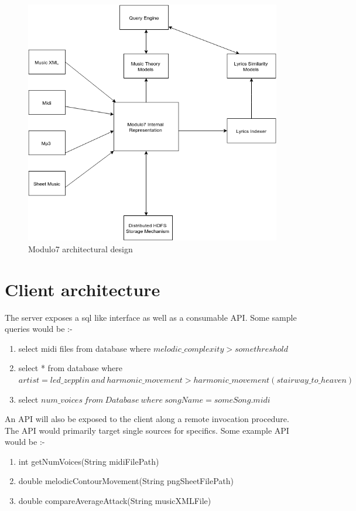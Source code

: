 \begin{figure}[t]
\centering
\includegraphics[width=\textwidth]{Modulo7Architecture.png}
\makeatletter
\let\@currsize\normalsize
\caption{Modulo7 architectural design}
\label{fig:figure}
\end{figure}
\section{Client architecture}
The server exposes a sql like interface as well as a consumable API. Some sample queries would be :-
\begin{enumerate}
\item select midi files from database where $melodic\_complexity > some threshold$
\item select * from database where $artist = led\_zepplin \ and \ harmonic\_movement > harmonic\_movement(stairway\_to\_heaven)$
\item select $ num\_voices \ from \ Database \ where \ songName = someSong.midi$ 
\end{enumerate}

An API will also be exposed to the client along a remote invocation procedure. The API would primarily target single sources for specifics. Some example API would be :-
\begin{enumerate}
\item int getNumVoices(String midiFilePath)
\item double melodicContourMovement(String pngSheetFilePath)
\item double compareAverageAttack(String musicXMLFile)
\end{enumerate}

